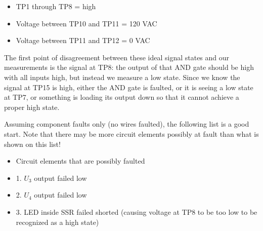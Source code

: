 \begin{itemize}
\item{} TP1 through TP8 = high
\item{} Voltage between TP10 and TP11 = 120 VAC
\item{} Voltage between TP11 and TP12 = 0 VAC
\end{itemize}

The first point of disagreement between these ideal signal states and our measurements is the signal at TP8: the output of that AND gate should be high with all inputs high, but instead we measure a low state.  Since we know the signal at TP15 is high, either the AND gate is faulted, or it is seeing a low state at TP7, or something is loading its output down so that it cannot achieve a proper high state.

\vskip 10pt

Assuming component faults only (no wires faulted), the following list is a good start.  Note that there may be more circuit elements possibly at fault than what is shown on this list!

\begin{itemize}
\item{} Circuit elements that are possibly faulted
\item{1.} $U_3$ output failed low
\item{2.} $U_4$ output failed low
\item{3.} LED inside SSR failed shorted (causing voltage at TP8 to be too low to be recognized as a high state)
\end{itemize}




